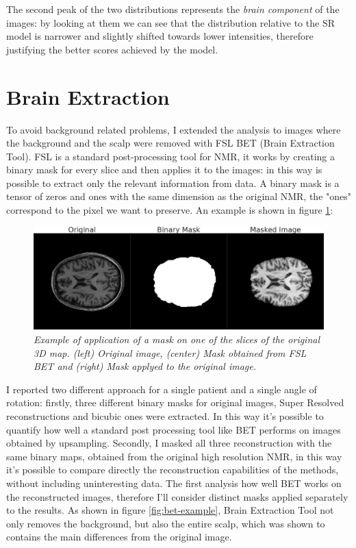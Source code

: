 \documentclass[12pt,a4paper]{report}
\begin{document}
The second peak of the two distributions represents the {\it brain component} of the images: 
by looking at them we can see that the distribution relative to the SR model is narrower and slightly shifted towards lower intensities, therefore justifying the better scores achieved by the model.


\section{Brain Extraction}

To avoid background related problems, I extended the analysis to images where the background and the scalp were removed with FSL BET (Brain Extraction Tool)\cite{fsl}.
FSL is a standard post-processing tool for NMR, it works by creating a binary mask for every slice and then applies it to the images: in this way is possible to extract only the relevant information from data. 
A binary mask is a tensor of zeros and ones with the same dimension as the original NMR, the "ones" correspond to the pixel we want to preserve. 
An example is shown in figure \ref{fig:mask-ex}:

\begin{figure}[H]
  \centering
  \includegraphics[scale=0.31]{./images/mask_example.png}
  \caption{\it Example of application of a mask on one of the slices of the original 3D map. (left) Original image, (center) Mask obtained from FSL BET and (right) Mask applyed to the original image. }
  \label{fig:mask-ex}
\end{figure}

I reported two different approach for a single patient and a single angle of rotation: firstly, three different binary masks for original images, Super Resolved reconstructions and bicubic ones were extracted. In this way it's possible to quantify how well a standard post processing tool like BET performs on images obtained by upsampling. 
Secondly, I masked all three reconstruction with the same binary maps, obtained from the original high resolution NMR, in this way it's possible to compare directly the reconstruction capabilities of the methods, without including uninteresting data.
The first analysis how well BET works on the reconstructed images, therefore I'll consider distinct masks applied separately to the results.
As shown in figure \ref{fig:bet-example}, Brain Extraction Tool not only removes the background, but also the entire scalp, which was shown to contains the main differences from the original image.
\end{document}
